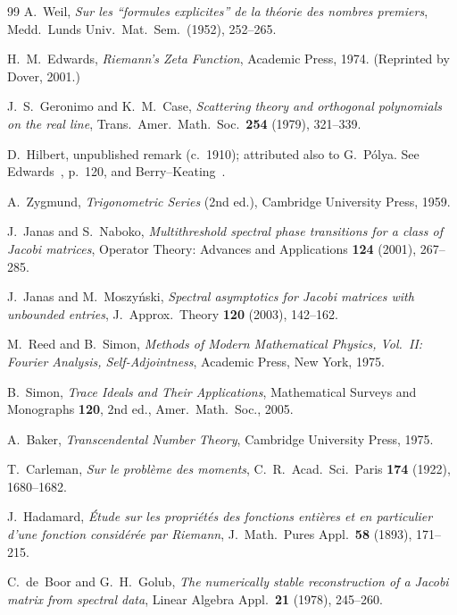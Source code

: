\documentclass{pre-aomart}
\theoremstyle{plain}
\theoremstyle{definition}
\theoremstyle{remark}
\begin{document}
\begin{thebibliography}{99}
A.~Weil,
\textit{Sur les ``formules explicites'' de la th\'eorie des nombres premiers},
Medd.\ Lunds Univ.\ Mat.\ Sem.\ (1952), 252--265.

H.~M.~Edwards,
\textit{Riemann's Zeta Function},
Academic Press, 1974.
(Reprinted by Dover, 2001.)

J.~S.~Geronimo and K.~M.~Case,
\textit{Scattering theory and orthogonal polynomials on the real line},
Trans.\ Amer.\ Math.\ Soc.\ \textbf{254} (1979), 321--339.

D.~Hilbert, unpublished remark (c.\ 1910); attributed also to G.~P\'olya.
See Edwards~\cite{Edwards1974}, p.~120, and Berry--Keating~\cite{BerryKeating1999}.

A.~Zygmund,
\textit{Trigonometric Series} (2nd ed.),
Cambridge University Press, 1959.

J.~Janas and S.~Naboko,
\textit{Multithreshold spectral phase transitions for a class of Jacobi matrices},
Operator Theory: Advances and Applications \textbf{124} (2001), 267--285.

J.~Janas and M.~Moszy\'nski,
\textit{Spectral asymptotics for Jacobi matrices with unbounded entries},
J.\ Approx.\ Theory \textbf{120} (2003), 142--162.

M.~Reed and B.~Simon,
\textit{Methods of Modern Mathematical Physics, Vol.~II: Fourier Analysis, Self-Adjointness},
Academic Press, New York, 1975.

B.~Simon,
\textit{Trace Ideals and Their Applications},
Mathematical Surveys and Monographs \textbf{120}, 2nd ed.,
Amer.\ Math.\ Soc., 2005.

A.~Baker,
\textit{Transcendental Number Theory},
Cambridge University Press, 1975.

T.~Carleman,
\textit{Sur le probl\`eme des moments},
C.\ R.\ Acad.\ Sci.\ Paris \textbf{174} (1922), 1680--1682.

J.~Hadamard,
\textit{\'Etude sur les propri\'et\'es des fonctions enti\`eres et en particulier d'une fonction consid\'er\'ee par Riemann},
J.\ Math.\ Pures Appl.\ \textbf{58} (1893), 171--215.

C.~de~Boor and G.~H.~Golub,
\textit{The numerically stable reconstruction of a Jacobi matrix from spectral data},
Linear Algebra Appl.\ \textbf{21} (1978), 245--260.

\end{thebibliography}
\end{document}

